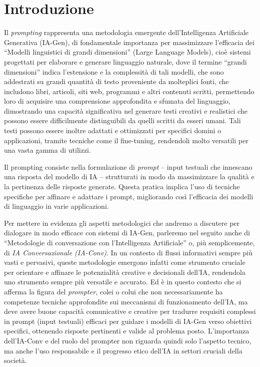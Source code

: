 \section{Introduzione}
    Il \textit{prompting} rappresenta una metodologia emergente dell'Intelligenza Artificiale Generativa (IA-Gen), di fondamentale importanza per massimizzare l'efficacia dei ``Modelli linguistici di grandi dimensioni'' (Large Language Models), cioè sistemi progettati per elaborare e generare linguaggio naturale, dove il termine “grandi dimensioni” indica l'estensione e la complessità di tali modelli, che sono addestrati su grandi quantità di testo proveniente da molteplici fonti, che includono libri, articoli, siti web, programmi e altri contenuti scritti, permettendo loro di acquisire una comprensione approfondita e sfumata del linguaggio, dimostrando una capacità significativa nel generare testi creativi e realistici che possono essere difficilmente distinguibili da quelli scritti da esseri umani. Tali testi possono essere inoltre adattati e ottimizzati per specifici domini o applicazioni, tramite tecniche come il fine-tuning, rendendoli molto versatili per una vasta gamma di utilizzi.

    Il prompting consiste nella formulazione di \textit{prompt} -- input testuali che innescano una risposta del modello di IA -- strutturati in modo da massimizzare la qualità e la pertinenza delle risposte generate. Questa pratica implica l'uso di tecniche specifiche per affinare e adattare i prompt, migliorando così l'efficacia dei modelli di linguaggio in varie applicazioni.

    Per mettere in evidenza gli aspetti metodologici che andremo a discutere per dialogare in modo efficace con sistemi di IA-Gen, parleremo nel seguito anche di ``Metodologie di conversazione con l’Intelligenza Artificiale'' o, più semplicemente, di \textit{IA Conversazionale (IA-Conv)}. In un contesto di flussi informativi sempre più vasti e pervasivi, queste metodologie emergono infatti come strumento cruciale per orientare e affinare le potenzialità creative e decisionali dell'IA, rendendola uno strumento sempre più versatile e accurato. Ed è in questo contesto che si afferma la figura del \textit{prompter}, colei o colui che non necessariamente ha competenze tecniche approfondite sui meccanismi di funzionamento dell'IA, ma deve avere buone capacità comunicative e creative per tradurre requisiti complessi in prompt (input testuali) efficaci per guidare i modelli di IA-Gen verso obiettivi specifici, ottenendo risposte pertinenti e valide al problema posto. L'importanza dell’IA-Conv e del ruolo del prompter non riguarda quindi solo l'aspetto tecnico, ma anche l'uso responsabile e il progresso etico dell'IA in settori cruciali della società.


